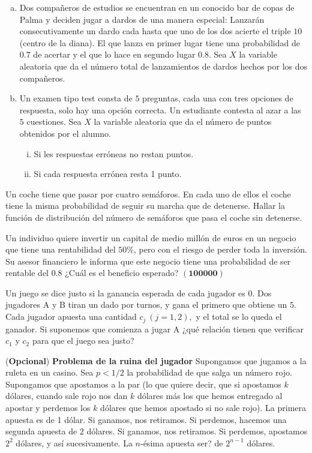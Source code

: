 \documentclass[12pt]{article}
\begin{document}
\begin{enumerate}[a)]
\item  Dos compañeros de estudios  se encuentran en un conocido bar de copas de Palma
y deciden jugar a dardos de una manera especial: Lanzarán consecutivamente un dardo cada
hasta que uno de los dos acierte el triple $10$ (centro de la diana).  El que lanza en
primer lugar tiene una probabilidad de $0.7$ de acertar  y el que lo hace en segundo lugar
$0.8$. Sea $X$ la variable aleatoria que da el número total de lanzamientos de dardos
hechos por los dos compañeros.

\item  Un examen tipo test  consta de $5$ preguntas, cada una  con tres opciones de
respuesta, solo hay una opción correcta. Un estudiante contesta al azar  a las $5$
cuestiones. Sea $X$ la variable aleatoria que da el número de puntos obtenidos por el
alumno.
\begin{enumerate}[i)]
\item Si les respuestas erróneas  no restan puntos.
\item Si cada respuesta errónea resta 1 punto.
\end{enumerate}
\end{enumerate}



\probl  Un coche tiene que  pasar por cuatro semáforos. En cada uno de ellos el coche tiene
la misma probabilidad de seguir su marcha que de detenerse. Hallar la función de
distribución del número de semáforos que pasa el coche sin detenerse.


\probl Un individuo quiere invertir un capital de medio millón de euros en un negocio que
tiene una rentabilidad del $50\%$, pero con el riesgo de perder toda la inversión. Su
asesor financiero le informa que este negocio tiene una probabilidad de ser rentable del
$0.8$ ¿Cuál es el beneficio esperado? $\mathbf{(100000)}$

\probl Un juego se dice justo si la ganancia esperada de cada jugador es $0$. Dos jugadores
A y  B tiran un dado por turnos, y gana el primero que obtiene un $5$. Cada jugador apuesta
una cantidad $ c_j \ (j=1,2),  $  y el total se lo queda el ganador. Si suponemos que
comienza  a jugar A ¿qué relación tienen que verificar $c_1$ y $c_2$ para que el juego sea
justo?


\probl  (\textbf{Opcional}) \textbf{Problema de la ruina del jugador} Supongamos que jugamos a la ruleta en un casino. Sea $p<1/2$ la probabilidad de que
salga un número rojo. Supongamos que apostamos a la par (lo que quiere decir, que si
apostamos $k$ dólares, cuando sale rojo nos dan $k$ dólares más los que hemos entregado al
apostar y perdemos los $k$ dólares que hemos apostado si no sale rojo). La primera apuesta es de 1 dólar. Si
ganamos, nos retiramos. Si perdemos, hacemos una segunda apuesta de $2$ dólares. Si
ganamos, nos retiramos. Si perdemos, apostamos $2^2$ dólares,  y así sucesivamente. La
$n$-ésima apuesta ser? de $2^{n-1}$ dólares.
\end{document}
